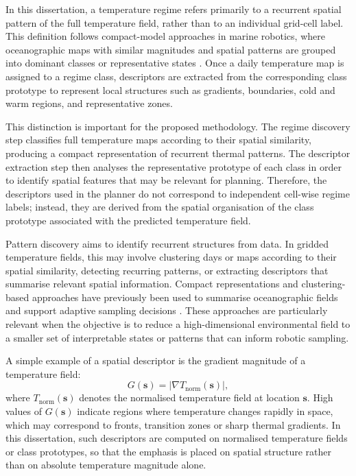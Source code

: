 In this dissertation, a temperature regime refers primarily to a recurrent spatial pattern of the full temperature field, rather than to an individual grid-cell label. This definition follows compact-model approaches in marine robotics, where oceanographic maps with similar magnitudes and spatial patterns are grouped into dominant classes or representative states \cite{fossum2020compact}. Once a daily temperature map is assigned to a regime class, descriptors are extracted from the corresponding class prototype to represent local structures such as gradients, boundaries, cold and warm regions, and representative zones.

This distinction is important for the proposed methodology. The regime discovery step classifies full temperature maps according to their spatial similarity, producing a compact representation of recurrent thermal patterns. The descriptor extraction step then analyses the representative prototype of each class in order to identify spatial features that may be relevant for planning. Therefore, the descriptors used in the planner do not correspond to independent cell-wise regime labels; instead, they are derived from the spatial organisation of the class prototype associated with the predicted temperature field.

Pattern discovery aims to identify recurrent structures from data. In gridded temperature fields, this may involve clustering days or maps according to their spatial similarity, detecting recurring patterns, or extracting descriptors that summarise relevant spatial information. Compact representations and clustering-based approaches have previously been used to summarise oceanographic fields and support adaptive sampling decisions \cite{fossum2020compact,ge2023watermasses}. These approaches are particularly relevant when the objective is to reduce a high-dimensional environmental field to a smaller set of interpretable states or patterns that can inform robotic sampling.

A simple example of a spatial descriptor is the gradient magnitude of a temperature field:
\begin{equation}
G(\mathbf{s}) = \left| \nabla T_{\mathrm{norm}}(\mathbf{s}) \right|,
\end{equation}
where $T_{\mathrm{norm}}(\mathbf{s})$ denotes the normalised temperature field at location $\mathbf{s}$. High values of $G(\mathbf{s})$ indicate regions where temperature changes rapidly in space, which may correspond to fronts, transition zones or sharp thermal gradients. In this dissertation, such descriptors are computed on normalised temperature fields or class prototypes, so that the emphasis is placed on spatial structure rather than on absolute temperature magnitude alone.

